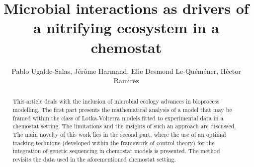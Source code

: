 \documentclass[3p,times]{elsarticle}
\begin{document}
\begin{frontmatter}



\dochead{}

\title{Microbial interactions as drivers of a nitrifying ecosystem in a chemostat}

\author{Pablo Ugalde-Salas, Jérôme Harmand, Elie Desmond Le-Quéméner, Héctor Ramirez}

\address{}

\begin{abstract}
	This article deals with the inclusion of microbial ecology advances in bioprocess modelling. The first part presents the mathematical analysis of a model that may be framed within the class of Lotka-Volterra models fitted to experimental data in a chemostat setting. The limitations and the insights of such an approach are discussed. The main novelty of this work lies in the second part, where the use of an optimal tracking technique (developed within the framework of control theory) for the integration of genetic sequencing in chemostat models is presented. The method revisits the data used in the aforementioned chemostat setting. 
\end{abstract}

\end{frontmatter}
\end{document}
